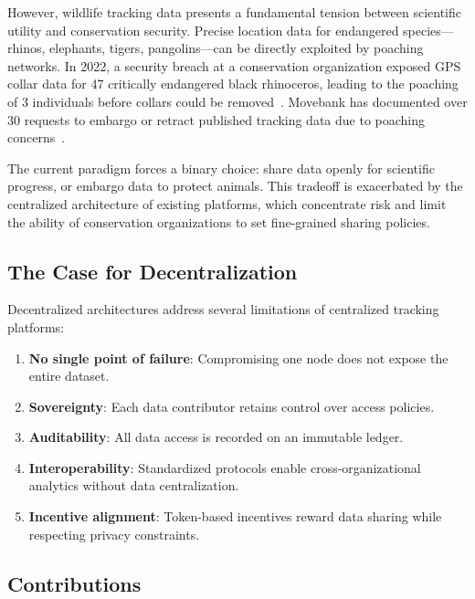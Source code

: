 \documentclass[11pt,letterpaper]{article}
\begin{document}
However, wildlife tracking data presents a fundamental tension between scientific utility and conservation security. Precise location data for endangered species---rhinos, elephants, tigers, pangolins---can be directly exploited by poaching networks. In 2022, a security breach at a conservation organization exposed GPS collar data for 47 critically endangered black rhinoceros, leading to the poaching of 3 individuals before collars could be removed~\cite{wri2023}. Movebank has documented over 30 requests to embargo or retract published tracking data due to poaching concerns~\cite{hebblewhite2022}.

The current paradigm forces a binary choice: share data openly for scientific progress, or embargo data to protect animals. This tradeoff is exacerbated by the centralized architecture of existing platforms, which concentrate risk and limit the ability of conservation organizations to set fine-grained sharing policies.

\subsection{The Case for Decentralization}

Decentralized architectures address several limitations of centralized tracking platforms:

\begin{enumerate}[leftmargin=*]
    \item \textbf{No single point of failure}: Compromising one node does not expose the entire dataset.
    \item \textbf{Sovereignty}: Each data contributor retains control over access policies.
    \item \textbf{Auditability}: All data access is recorded on an immutable ledger.
    \item \textbf{Interoperability}: Standardized protocols enable cross-organizational analytics without data centralization.
    \item \textbf{Incentive alignment}: Token-based incentives reward data sharing while respecting privacy constraints.
\end{enumerate}

\subsection{Contributions}
\end{document}
